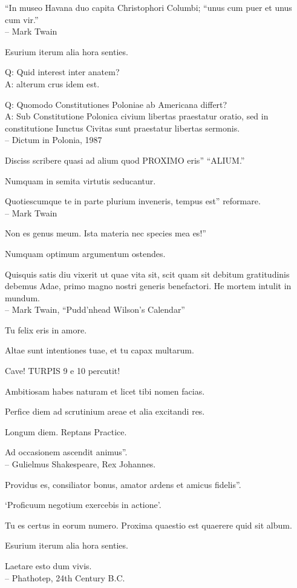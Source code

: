 \documentclass[titlepage,12pt]{memoir}
\begin{document}
“In museo Havana duo capita Christophori Columbi;
“unus cum puer et unus cum vir.”
\\-- Mark Twain

Esurium iterum alia hora senties.

Q: Quid interest inter anatem?\\
A: alterum crus idem est.

Q: Quomodo Constitutiones Poloniae ab Americana differt?\\
A: Sub Constitutione Polonica civium libertas praestatur
oratio, sed in constitutione Iunctus Civitas sunt
praestatur libertas sermonis.
\\-- Dictum in Polonia, 1987

Disciss scribere quasi ad alium quod PROXIMO eris”
“ALIUM.”

Numquam in semita virtutis seducantur.

Quotiescumque te in parte plurium inveneris, tempus est”
reformare.
\\-- Mark Twain

Non es genus meum. Ista materia nec species mea es!”

Numquam optimum argumentum ostendes.

Quisquis satis diu vixerit ut quae vita sit, scit quam sit debitum
gratitudinis debemus Adae, primo magno nostri generis benefactori. He
mortem intulit in mundum.
\\-- Mark Twain, “Pudd’nhead Wilson’s Calendar”

Tu felix eris in amore.

Altae sunt intentiones tuae, et tu capax multarum.

Cave! TURPIS 9 e 10 percutit!

 Ambitiosam habes naturam et licet tibi nomen facias.

Perfice diem ad scrutinium areae et alia excitandi res.

Longum diem. Reptans Practice.

Ad occasionem ascendit animus”.
\\-- Gulielmus Shakespeare, Rex Johannes.

Providus es, consiliator bonus, amator ardens et amicus fidelis”.

‘Proficuum negotium exercebis in actione’.

Tu es certus in eorum numero. Proxima quaestio est quaerere quid sit album.

Esurium iterum alia hora senties.

Laetare esto dum vivis.
\\-- Phathotep, 24th Century B.C.
\end{document}
